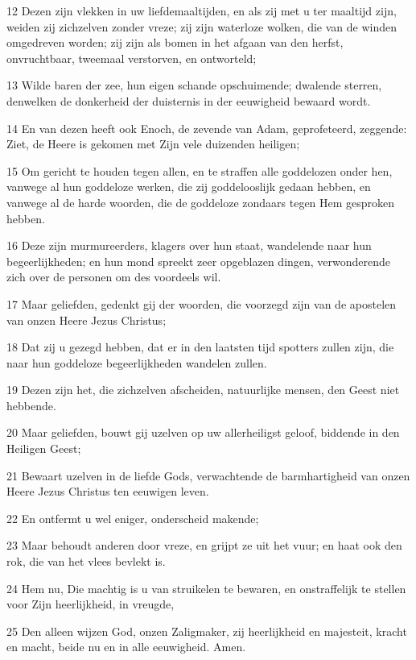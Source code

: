 \par 12 Dezen zijn vlekken in uw liefdemaaltijden, en als zij met u ter maaltijd zijn, weiden zij zichzelven zonder vreze; zij zijn waterloze wolken, die van de winden omgedreven worden; zij zijn als bomen in het afgaan van den herfst, onvruchtbaar, tweemaal verstorven, en ontworteld;
\par 13 Wilde baren der zee, hun eigen schande opschuimende; dwalende sterren, denwelken de donkerheid der duisternis in der eeuwigheid bewaard wordt.
\par 14 En van dezen heeft ook Enoch, de zevende van Adam, geprofeteerd, zeggende: Ziet, de Heere is gekomen met Zijn vele duizenden heiligen;
\par 15 Om gericht te houden tegen allen, en te straffen alle goddelozen onder hen, vanwege al hun goddeloze werken, die zij goddelooslijk gedaan hebben, en vanwege al de harde woorden, die de goddeloze zondaars tegen Hem gesproken hebben.
\par 16 Deze zijn murmureerders, klagers over hun staat, wandelende naar hun begeerlijkheden; en hun mond spreekt zeer opgeblazen dingen, verwonderende zich over de personen om des voordeels wil.
\par 17 Maar geliefden, gedenkt gij der woorden, die voorzegd zijn van de apostelen van onzen Heere Jezus Christus;
\par 18 Dat zij u gezegd hebben, dat er in den laatsten tijd spotters zullen zijn, die naar hun goddeloze begeerlijkheden wandelen zullen.
\par 19 Dezen zijn het, die zichzelven afscheiden, natuurlijke mensen, den Geest niet hebbende.
\par 20 Maar geliefden, bouwt gij uzelven op uw allerheiligst geloof, biddende in den Heiligen Geest;
\par 21 Bewaart uzelven in de liefde Gods, verwachtende de barmhartigheid van onzen Heere Jezus Christus ten eeuwigen leven.
\par 22 En ontfermt u wel eniger, onderscheid makende;
\par 23 Maar behoudt anderen door vreze, en grijpt ze uit het vuur; en haat ook den rok, die van het vlees bevlekt is.
\par 24 Hem nu, Die machtig is u van struikelen te bewaren, en onstraffelijk te stellen voor Zijn heerlijkheid, in vreugde,
\par 25 Den alleen wijzen God, onzen Zaligmaker, zij heerlijkheid en majesteit, kracht en macht, beide nu en in alle eeuwigheid. Amen.

